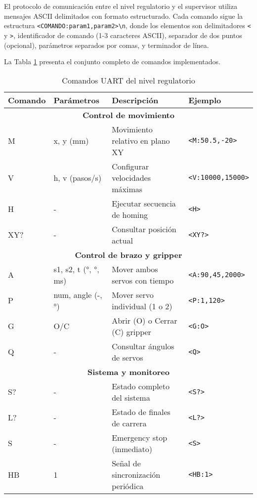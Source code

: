 El protocolo de comunicación entre el nivel regulatorio y el supervisor utiliza mensajes ASCII delimitados con formato estructurado. Cada comando sigue la estructura \texttt{<COMANDO:param1,param2>\textbackslash n}, donde los elementos son delimitadores \texttt{<} y \texttt{>}, identificador de comando (1-3 caracteres ASCII), separador de dos puntos (opcional), parámetros separados por comas, y terminador de línea.

La Tabla \ref{tab:comandos_uart} presenta el conjunto completo de comandos implementados.

\begin{table}[H]
\centering
\small
\begin{tabular}{|l|l|p{4.5cm}|l|}
\hline
\textbf{Comando} & \textbf{Parámetros} & \textbf{Descripción} & \textbf{Ejemplo} \\
\hline
\multicolumn{4}{|c|}{\textbf{Control de movimiento}} \\
\hline
M & x, y (mm) & Movimiento relativo en plano XY & \texttt{<M:50.5,-20>} \\
\hline
V & h, v (pasos/s) & Configurar velocidades máximas & \texttt{<V:10000,15000>} \\
\hline
H & - & Ejecutar secuencia de homing & \texttt{<H>} \\
\hline
XY? & - & Consultar posición actual & \texttt{<XY?>} \\
\hline
\multicolumn{4}{|c|}{\textbf{Control de brazo y gripper}} \\
\hline
A & s1, s2, t (°, °, ms) & Mover ambos servos con tiempo & \texttt{<A:90,45,2000>} \\
\hline
P & num, angle (-, °) & Mover servo individual (1 o 2) & \texttt{<P:1,120>} \\
\hline
G & O/C & Abrir (O) o Cerrar (C) gripper & \texttt{<G:O>} \\
\hline
Q & - & Consultar ángulos de servos & \texttt{<Q>} \\
\hline
\multicolumn{4}{|c|}{\textbf{Sistema y monitoreo}} \\
\hline
S? & - & Estado completo del sistema & \texttt{<S?>} \\
\hline
L? & - & Estado de finales de carrera & \texttt{<L?>} \\
\hline
S & - & Emergency stop (inmediato) & \texttt{<S>} \\
\hline
HB & 1 & Señal de sincronización periódica & \texttt{<HB:1>} \\
\hline
\end{tabular}
\caption{Comandos UART del nivel regulatorio}
\label{tab:comandos_uart}
\end{table}


